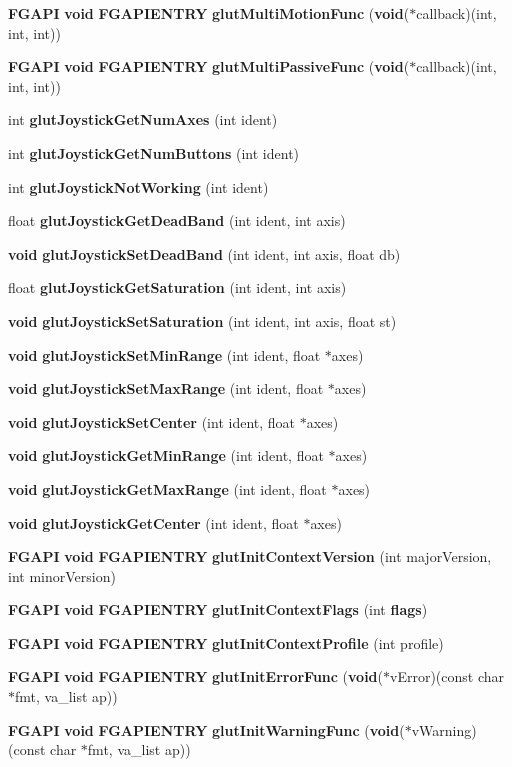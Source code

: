 \begin{DoxyCompactItemize}
\item 
{\bf F\+G\+A\+P\+I} {\bf void} {\bf F\+G\+A\+P\+I\+E\+N\+T\+R\+Y} {\bf glut\+Multi\+Motion\+Func} ({\bf void}($\ast$callback)(int, int, int))
\item 
{\bf F\+G\+A\+P\+I} {\bf void} {\bf F\+G\+A\+P\+I\+E\+N\+T\+R\+Y} {\bf glut\+Multi\+Passive\+Func} ({\bf void}($\ast$callback)(int, int, int))
\item 
int {\bf glut\+Joystick\+Get\+Num\+Axes} (int ident)
\item 
int {\bf glut\+Joystick\+Get\+Num\+Buttons} (int ident)
\item 
int {\bf glut\+Joystick\+Not\+Working} (int ident)
\item 
float {\bf glut\+Joystick\+Get\+Dead\+Band} (int ident, int axis)
\item 
{\bf void} {\bf glut\+Joystick\+Set\+Dead\+Band} (int ident, int axis, float db)
\item 
float {\bf glut\+Joystick\+Get\+Saturation} (int ident, int axis)
\item 
{\bf void} {\bf glut\+Joystick\+Set\+Saturation} (int ident, int axis, float st)
\item 
{\bf void} {\bf glut\+Joystick\+Set\+Min\+Range} (int ident, float $\ast$axes)
\item 
{\bf void} {\bf glut\+Joystick\+Set\+Max\+Range} (int ident, float $\ast$axes)
\item 
{\bf void} {\bf glut\+Joystick\+Set\+Center} (int ident, float $\ast$axes)
\item 
{\bf void} {\bf glut\+Joystick\+Get\+Min\+Range} (int ident, float $\ast$axes)
\item 
{\bf void} {\bf glut\+Joystick\+Get\+Max\+Range} (int ident, float $\ast$axes)
\item 
{\bf void} {\bf glut\+Joystick\+Get\+Center} (int ident, float $\ast$axes)
\item 
{\bf F\+G\+A\+P\+I} {\bf void} {\bf F\+G\+A\+P\+I\+E\+N\+T\+R\+Y} {\bf glut\+Init\+Context\+Version} (int major\+Version, int minor\+Version)
\item 
{\bf F\+G\+A\+P\+I} {\bf void} {\bf F\+G\+A\+P\+I\+E\+N\+T\+R\+Y} {\bf glut\+Init\+Context\+Flags} (int {\bf flags})
\item 
{\bf F\+G\+A\+P\+I} {\bf void} {\bf F\+G\+A\+P\+I\+E\+N\+T\+R\+Y} {\bf glut\+Init\+Context\+Profile} (int profile)
\item 
{\bf F\+G\+A\+P\+I} {\bf void} {\bf F\+G\+A\+P\+I\+E\+N\+T\+R\+Y} {\bf glut\+Init\+Error\+Func} ({\bf void}($\ast$v\+Error)(const char $\ast$fmt, va\+\_\+list ap))
\item 
{\bf F\+G\+A\+P\+I} {\bf void} {\bf F\+G\+A\+P\+I\+E\+N\+T\+R\+Y} {\bf glut\+Init\+Warning\+Func} ({\bf void}($\ast$v\+Warning)(const char $\ast$fmt, va\+\_\+list ap))
\end{DoxyCompactItemize}


